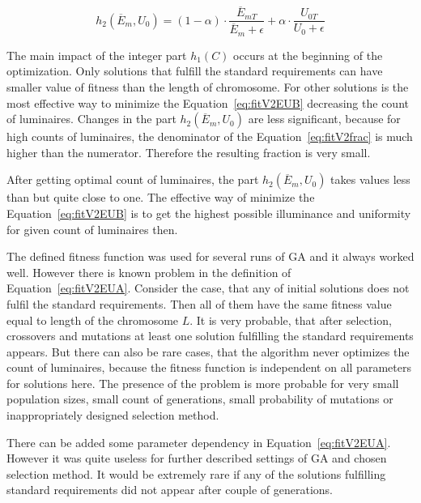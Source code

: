 \begin{equation}
\label{eq:fitV2frac}
	h_2\left(\overline{E}_{m}, U_0\right)= \left( 1 - \alpha\right)\cdot\frac{\overline{E}_{mT}}{\overline{E}_{m}+\epsilon} + \alpha\cdot\frac{U_{0T}}{U_0 + \epsilon}
\end{equation}

The main impact of the integer part $h_1\left(C\right)$ occurs at the beginning of the optimization. Only solutions that fulfill the standard requirements can have smaller value of fitness than the length of chromosome. For other solutions is the most effective way to minimize the Equation~\ref{eq:fitV2EUB} decreasing the count of luminaires. Changes in the part $h_2\left(\overline{E}_{m}, U_0\right)$ are less significant, because for high counts of luminaires, the denominator of the Equation~\ref{eq:fitV2frac} is much higher than the numerator. Therefore the resulting fraction is very small.

After getting optimal count of luminaires, the part $h_2\left(\overline{E}_{m}, U_0\right)$ takes values less than but quite close to one. The effective way of minimize the Equation~\ref{eq:fitV2EUB} is to get the highest possible illuminance and uniformity for given count of luminaires then.

The defined fitness function was used for several runs of GA and it always worked well. However there is known problem in the definition of Equation~\ref{eq:fitV2EUA}. Consider the case, that any of initial solutions does not fulfil the standard requirements. Then all of them have the same  fitness value equal to length of the chromosome $L$. It is very probable, that after selection, crossovers and mutations at least one solution fulfilling the standard requirements appears. But there can also be rare  cases, that the algorithm never optimizes the count of luminaires, because the fitness function is independent on all parameters for solutions here. The presence of the problem is more probable for very small population sizes, small count of generations, small probability of mutations or inappropriately designed selection method.

There can be added some parameter dependency in Equation~\ref{eq:fitV2EUA}. However it was quite useless for further described settings of GA and chosen selection method. It would be extremely rare if any of the solutions fulfilling standard requirements did not appear after couple of generations.

